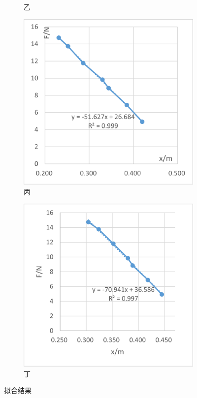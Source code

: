 \documentclass[a4paper,zihao=5,UTF8,fontset=fandol]{../phyreport}
\begin{document}
\begin{figure}[H]
\begin{subfigure}{0.45\textwidth}
		\caption{乙}
	\end{subfigure}
	\begin{subfigure}{0.45\textwidth}
		\centering
		\includegraphics[width=\textwidth]{./fig/k51.png}
		\caption{丙}
	\end{subfigure}
	\begin{subfigure}{0.45\textwidth}
		\centering
		\includegraphics[width=\textwidth]{./fig/k70.png}
		\caption{丁}
	\end{subfigure}
	\caption{拟合结果}
	\label{fig:弹性系数}
\end{figure}
\end{document}
